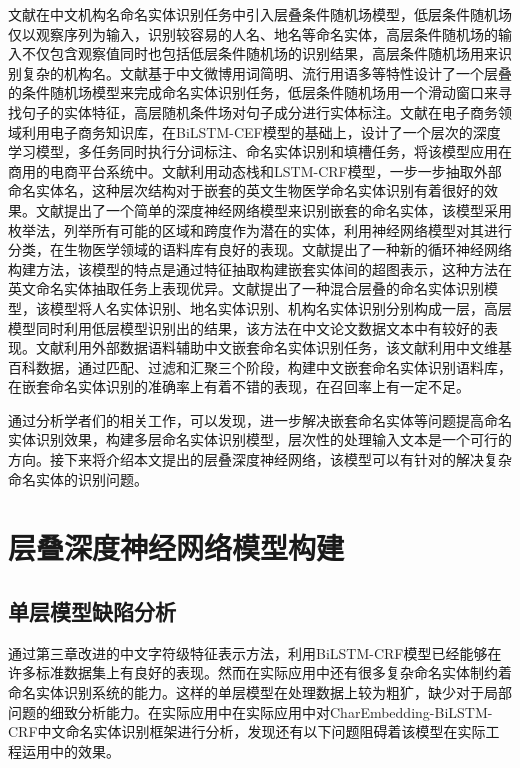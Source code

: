 \documentclass[winfonts,master,oneside,nobackinfo]{njuthesis}
\begin{document}
文献\cite{junsheng}在中文机构名命名实体识别任务中引入层叠条件随机场模型，低层条件随机场仅以观察序列为输入，识别较容易的人名、地名等命名实体，高层条件随机场的输入不仅包含观察值同时也包括低层条件随机场的识别结果，高层条件随机场用来识别复杂的机构名。文献\cite{Yixue}基于中文微博用词简明、流行用语多等特性设计了一个层叠的条件随机场模型来完成命名实体识别任务，低层条件随机场用一个滑动窗口来寻找句子的实体特征，高层随机条件场对句子成分进行实体标注。文献\cite{taobao}在电子商务领域利用电子商务知识库，在BiLSTM-CEF模型的基础上，设计了一个层次的深度学习模型，多任务同时执行分词标注、命名实体识别和填槽任务，将该模型应用在商用的电商平台系统中。文献\cite{Meizhi}利用动态栈和LSTM-CRF模型，一步一步抽取外部命名实体名，这种层次结构对于嵌套的英文生物医学命名实体识别有着很好的效果。文献\cite{Mohammad}提出了一个简单的深度神经网络模型来识别嵌套的命名实体，该模型采用枚举法，列举所有可能的区域和跨度作为潜在的实体，利用神经网络模型对其进行分类，在生物医学领域的语料库有良好的表现。文献\cite{Arzoo}提出了一种新的循环神经网络构建方法，该模型的特点是通过特征抽取构建嵌套实体间的超图表示，这种方法在英文命名实体抽取任务上表现优异。文献\cite{Jia}提出了一种混合层叠的命名实体识别模型，该模型将人名实体识别、地名实体识别、机构名实体识别分别构成一层，高层模型同时利用低层模型识别出的结果，该方法在中文论文数据文本中有较好的表现。文献\cite{yanqun}利用外部数据语料辅助中文嵌套命名实体识别任务，该文献利用中文维基百科数据，通过匹配、过滤和汇聚三个阶段，构建中文嵌套命名实体识别语料库，在嵌套命名实体识别的准确率上有着不错的表现，在召回率上有一定不足。

通过分析学者们的相关工作，可以发现，进一步解决嵌套命名实体等问题提高命名实体识别效果，构建多层命名实体识别模型，层次性的处理输入文本是一个可行的方向。接下来将介绍本文提出的层叠深度神经网络，该模型可以有针对的解决复杂命名实体的识别问题。

\section{层叠深度神经网络模型构建}

\subsection{单层模型缺陷分析}

通过第三章改进的中文字符级特征表示方法，利用BiLSTM-CRF模型已经能够在许多标准数据集上有良好的表现。然而在实际应用中还有很多复杂命名实体制约着命名实体识别系统的能力。这样的单层模型在处理数据上较为粗犷，缺少对于局部问题的细致分析能力。在实际应用中在实际应用中对CharEmbedding-BiLSTM-CRF中文命名实体识别框架进行分析，发现还有以下问题阻碍着该模型在实际工程运用中的效果。
\end{document}
